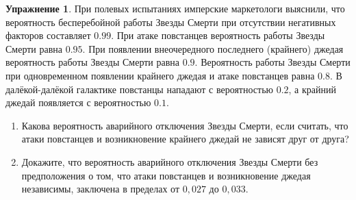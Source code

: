 \documentclass[12pt, a4paper, oneside]{extreport}
\theoremstyle{plain}              %
\theoremstyle{definition}         %
\newtheorem{problem}{\color{myblue} Упражнение}
\begin{document}
\begin{problem}

При полевых испытаниях имперские маркетологи выяснили, что вероятность бесперебойной работы Звезды Смерти при отсутствии негативных факторов составляет $0.99$. При атаке повстанцев вероятность работы Звезды Смерти равна $0.95$. При появлении внеочередного последнего (крайнего) джедая вероятность работы Звезды Смерти равна $0.9$.  Вероятность работы Звезды Смерти при одновременном появлении крайнего джедая и атаке повстанцев равна $0.8$.  В далёкой-далёкой галактике повстанцы нападают с вероятностью $0.2$, а крайний джедай появляется с вероятностью $0.1$. 
	
\begin{enumerate}
\item  Какова вероятность аварийного отключения Звезды Смерти, если считать, что атаки повстанцев и возникновение крайнего джедай не зависят друг от друга?
\item  Докажите, что вероятность аварийного отключения Звезды Смерти без предположения о том, что атаки повстанцев и возникновение джедая независимы, заключена в пределах от $0,027$ до $0,033$.
\end{enumerate} 
\end{problem}
\end{document}
